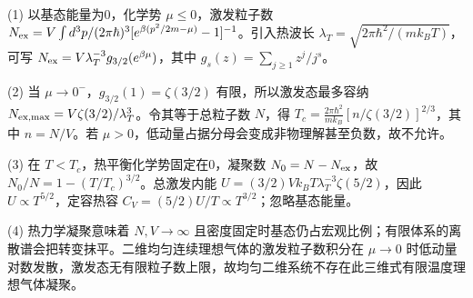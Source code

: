 (1) 以基态能量为0，化学势 \(\mu\le0\)，激发粒子数 \(N_{\rm ex}=V\int d^3p/(2\pi\hbar)^3[e^{\beta(p^2/2m-\mu)}-1]^{-1}\)。引入热波长 \(\lambda_T=\sqrt{2\pi\hbar^2/(mk_BT)}\)，可写 \(N_{\rm ex}=V\lambda_T^{-3}g_{3/2}(e^{\beta\mu})\)，其中 \(g_s(z)=\sum_{j\ge1}z^j/j^s\)。

(2) 当 \(\mu\to0^-\)，\(g_{3/2}(1)=\zeta(3/2)\) 有限，所以激发态最多容纳 \(N_{\rm ex,max}=V\zeta(3/2)/\lambda_T^3\)。令其等于总粒子数 \(N\)，得 \(\boxed{T_c=\frac{2\pi\hbar^2}{mk_B}[n/\zeta(3/2)]^{2/3}}\)，其中 \(n=N/V\)。若 \(\mu>0\)，低动量占据分母会变成非物理解甚至负数，故不允许。

(3) 在 \(T<T_c\)，热平衡化学势固定在0，凝聚数 \(N_0=N-N_{\rm ex}\)，故 \(\boxed{N_0/N=1-(T/T_c)^{3/2}}\)。总激发内能 \(U=(3/2)Vk_BT\lambda_T^{-3}\zeta(5/2)\)，因此 \(U\propto T^{5/2}\)，定容热容 \(C_V=(5/2)U/T\propto T^{3/2}\)；忽略基态能量。

(4) 热力学凝聚意味着 \(N,V\to\infty\) 且密度固定时基态仍占宏观比例；有限体系的离散谱会把转变抹平。二维均匀连续理想气体的激发粒子数积分在 \(\mu\to0\) 时低动量对数发散，激发态无有限粒子数上限，故均匀二维系统不存在此三维式有限温度理想气体凝聚。
